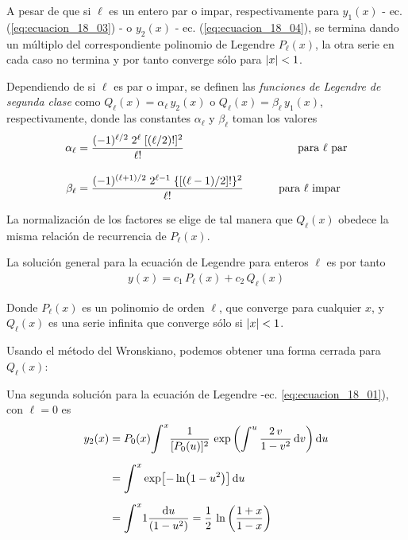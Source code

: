 A pesar de que si $\ell$ es un entero par o impar, respectivamente para $y_{1}(x)$ - ec. (\ref{eq:ecuacion_18_03}) - o $y_{2}(x)$ - ec. (\ref{eq:ecuacion_18_04}), se termina dando un múltiplo del correspondiente polinomio de Legendre $P_{\ell}(x)$, la otra serie en cada caso no termina y por tanto converge sólo para $\abs{x} < 1$.
\par
Dependiendo de si $\ell$ es par o impar, se definen las \emph{funciones de Legendre de segunda clase} como $Q_{\ell}(x) =  \alpha_{\ell} \, y_{2}(x)$ o $Q_{\ell}(x) =  \beta_{\ell} \, y_{1}(x)$, respectivamente, donde las constantes $\alpha_{\ell}$ y $\beta_{\ell}$ toman los valores
\begin{align}
\alpha_{\ell} &= \dfrac{(-1)^{\ell/2} \; 2^{\ell} \; [(\ell / 2)!]^{2}}{\ell!} \hspace{3.5cm} \mbox{ para $\ell$ par} \label{eq:ecuacion_18_05}\\[1em]
\beta_{\ell} &= \dfrac{(-1)^{(\ell + 1)/2} \; 2^{\ell - 1} \; \lbrace \left[ (\ell - 1) /2 \right] ! \rbrace^{2}}{\ell!} \hspace{1cm} \mbox{ para $\ell$ impar} \label{eq:ecuacion_18_06}
\end{align}

La normalización de los factores se elige de tal manera que $Q_{\ell}(x)$ obedece la misma relación de recurrencia de $P_{\ell}(x)$.
\par
La solución general para la ecuación de Legendre para enteros $\ell$ es por tanto
\begin{align}
y(x) = c_{1} \, P_{\ell}(x) + c_{2} \, Q_{\ell} (x) 
\label{eq:ecuacion_18_07}
\end{align}

Donde $P_{\ell}(x)$ es un polinomio de orden $\ell$, que converge para cualquier $x$, y $Q_{\ell}(x)$ es una serie infinita que converge sólo si $\abs{x} < 1$.
\par
Usando el método del Wronskiano, podemos obtener una forma cerrada para $Q_{\ell}(x)$:
\par
Una segunda solución para la ecuación de Legendre -ec. \ref{eq:ecuacion_18_01}), con $\ell = 0$ es
\begin{align}
\begin{aligned}[b]
y_{2}(x) &= P_{0}(x) \scaleint{6ex}_{\bs }^{x} \dfrac{1}{[P_{0}(u)]^{2}} \, \exp \left( \int^{u} \dfrac{2 \, v}{1 - v^{2}} \dd{v} \right) \dd{u} \\[0.5em]
&= \scaleint{6ex}_{\bs }^{x} \exp [ - \ln (1 - u^{2}) ] \dd{u} \\[0.5em]
&= \scaleint{6ex}_{\bs }^{x} 1\dfrac{\dd{u}}{(1 - u^{2})} = \dfrac{1}{2} \, \ln \left( \dfrac{1 + x}{1 - x} \right)
\end{aligned}
\label{eq:ecuacion_18_08}
\end{align}

